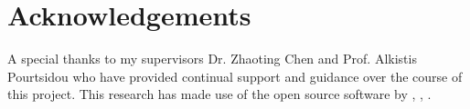 \section*{Acknowledgements}

A special thanks to my supervisors Dr. Zhaoting Chen and Prof. Alkistis Pourtsidou who have provided continual support and guidance over the course of this project. This research has made use of the open source software by \cite{foreman-mackeyEmceeMCMCHammer2013a}, \cite{foreman-mackeyCornerpyScatterplotMatrices2016a}, \cite{virtanenSciPy10Fundamental2020}.